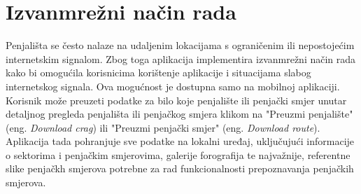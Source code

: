 \section{Izvanmrežni način rada}

Penjališta se često nalaze na udaljenim lokacijama s ograničenim ili nepostojećim internetskim signalom. Zbog toga aplikacija implementira izvanmrežni način rada kako bi omogućila korisnicima korištenje aplikacije i situacijama slabog internetskog signala. Ova mogućnost je dostupna samo na mobilnoj aplikaciji. Korisnik može preuzeti podatke za bilo koje penjalište ili penjački smjer unutar detaljnog pregleda penjališta ili penjačkog smjera klikom na "Preuzmi penjalište" (eng. \textit{Download crag}) ili "Preuzmi penjački smjer" (eng. \textit{Download route}). Aplikacija tada pohranjuje sve podatke na lokalni uređaj, uključujući informacije o sektorima i penjačkim smjerovima, galerije forografija te najvažnije, referentne slike penjačkh smjerova potrebne za rad funkcionalnosti prepoznavanja penjačkih smjerova.

